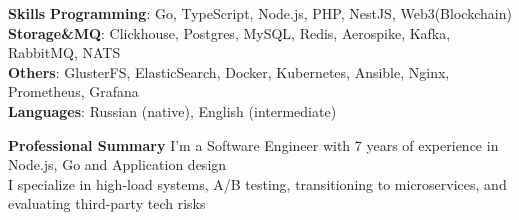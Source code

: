 \documentclass{resume} %
\begin{document}
\begin{rSection}{\textbf{Skills}}
       \textbf{Programming}: Go, TypeScript, Node.js, PHP, NestJS, Web3(Blockchain)
       \\ \textbf{Storage\&MQ}: Clickhouse, Postgres, MySQL, Redis, Aerospike, Kafka, RabbitMQ, NATS
       \\ \textbf{Others}: GlusterFS, ElasticSearch, Docker, Kubernetes, Ansible, Nginx, Prometheus, Grafana
       \\ \textbf{Languages}: Russian (native), English (intermediate)
\end{rSection}

\begin{rSection}{\textbf{Professional Summary}}
{
    I'm a Software Engineer with 7 years of experience in Node.js, Go and Application design
    \\ I specialize in high-load systems, A/B testing, transitioning to microservices, and evaluating third-party tech risks
}

\end{rSection}
\end{document}
